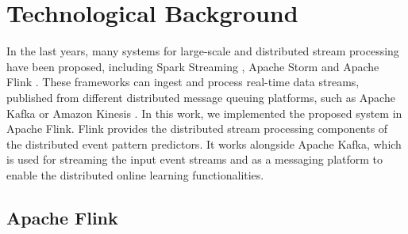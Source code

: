 \section{Technological Background}

\par In the last years, many systems for large-scale and distributed stream processing have been proposed, including Spark Streaming \cite{Spark},  Apache Storm \cite{Storm} and Apache Flink \cite{Flink}. These frameworks can ingest and process real-time data streams, published from different distributed message queuing platforms, such as Apache Kafka \cite{Kafka} or  Amazon Kinesis \cite{Kinesis}. In this work, we implemented the proposed system in Apache Flink. Flink provides the distributed stream processing components of the distributed event pattern predictors. It works alongside Apache Kafka,
which is used for streaming the input event streams and as a messaging platform to enable the distributed online learning functionalities.





\subsection{Apache Flink}

